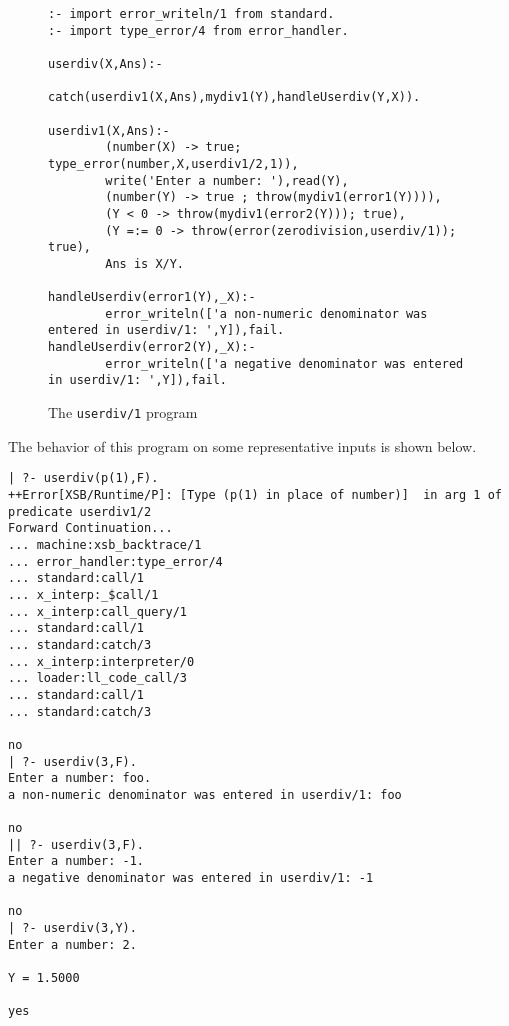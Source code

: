 \begin{figure}[hbtp]
\longline
\begin{small}
\begin{verbatim}
:- import error_writeln/1 from standard.
:- import type_error/4 from error_handler.

userdiv(X,Ans):- 
        catch(userdiv1(X,Ans),mydiv1(Y),handleUserdiv(Y,X)).

userdiv1(X,Ans):- 
        (number(X) -> true; type_error(number,X,userdiv1/2,1)),
        write('Enter a number: '),read(Y),
        (number(Y) -> true ; throw(mydiv1(error1(Y)))),
        (Y < 0 -> throw(mydiv1(error2(Y))); true),
        (Y =:= 0 -> throw(error(zerodivision,userdiv/1)); true),
        Ans is X/Y.

handleUserdiv(error1(Y),_X):- 
        error_writeln(['a non-numeric denominator was entered in userdiv/1: ',Y]),fail.
handleUserdiv(error2(Y),_X):- 
        error_writeln(['a negative denominator was entered in userdiv/1: ',Y]),fail.
\end{verbatim}
\end{small}
\caption{The {\tt userdiv/1} program} \label{fig:userdiv}
\longline
\end{figure}

The behavior of this program on some representative inputs is shown
below.

\begin{small}
\begin{verbatim}
| ?- userdiv(p(1),F).
++Error[XSB/Runtime/P]: [Type (p(1) in place of number)]  in arg 1 of predicate userdiv1/2
Forward Continuation...
... machine:xsb_backtrace/1
... error_handler:type_error/4
... standard:call/1
... x_interp:_$call/1
... x_interp:call_query/1
... standard:call/1
... standard:catch/3
... x_interp:interpreter/0
... loader:ll_code_call/3
... standard:call/1
... standard:catch/3

no
| ?- userdiv(3,F).
Enter a number: foo.
a non-numeric denominator was entered in userdiv/1: foo

no
|| ?- userdiv(3,F).
Enter a number: -1.
a negative denominator was entered in userdiv/1: -1

no
| ?- userdiv(3,Y).
Enter a number: 2.

Y = 1.5000

yes
\end{verbatim}
\end{small}

